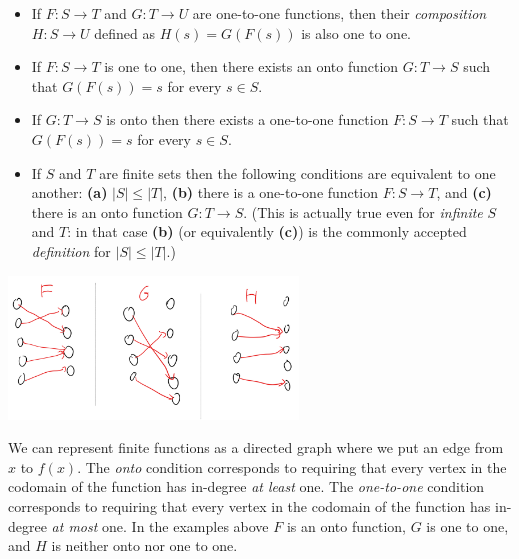 \begin{itemize}
\item
  If \(F:S \rightarrow T\) and \(G:T \rightarrow U\) are one-to-one
  functions, then their \emph{composition} \(H:S \rightarrow U\) defined
  as \(H(s)=G(F(s))\) is also one to one.
\item
  If \(F:S \rightarrow T\) is one to one, then there exists an onto
  function \(G:T \rightarrow S\) such that \(G(F(s))=s\) for every
  \(s\in S\).
\item
  If \(G:T \rightarrow S\) is onto then there exists a one-to-one
  function \(F:S \rightarrow T\) such that \(G(F(s))=s\) for every
  \(s\in S\).
\item
  If \(S\) and \(T\) are finite sets then the following conditions are
  equivalent to one another: \textbf{(a)} \(|S| \leq |T|\), \textbf{(b)}
  there is a one-to-one function \(F:S \rightarrow T\), and \textbf{(c)}
  there is an onto function \(G:T \rightarrow S\). (This is actually
  true even for \emph{infinite} \(S\) and \(T\): in that case
  \textbf{(b)} (or equivalently \textbf{(c)}) is the commonly accepted
  \emph{definition} for \(|S| \leq |T|\).)
\end{itemize}


\begin{marginfigure}
\centering
\includegraphics[width=\linewidth, height=1.5in, keepaspectratio]{../figure/functionsdiagram.png}
\caption{We can represent finite functions as a directed graph where we
put an edge from \(x\) to \(f(x)\). The \emph{onto} condition
corresponds to requiring that every vertex in the codomain of the
function has in-degree \emph{at least} one. The \emph{one-to-one}
condition corresponds to requiring that every vertex in the codomain of
the function has in-degree \emph{at most} one. In the examples above
\(F\) is an onto function, \(G\) is one to one, and \(H\) is neither
onto nor one to one.}
\label{functionsdiagrampng}
\end{marginfigure}


